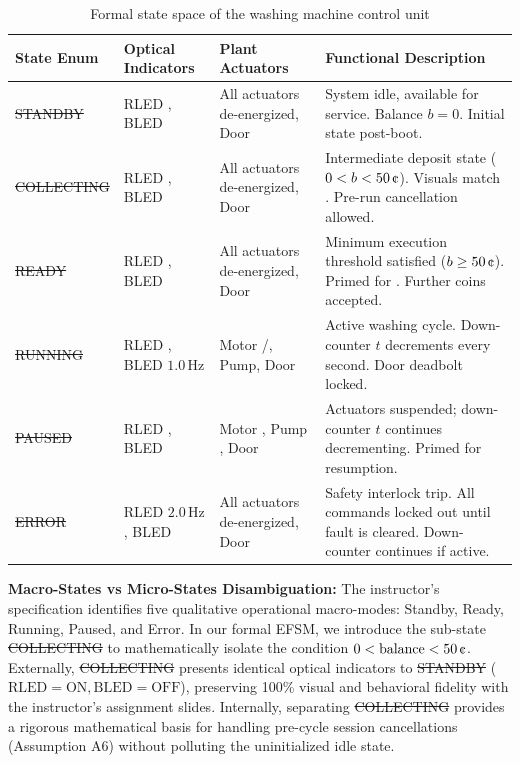 \begin{table}[H]
  \centering
  \caption{Formal state space of the washing machine control unit}
  \label{tab:states}
  \small
  \renewcommand{\arraystretch}{1.2}
  \begin{tabularx}{\linewidth}{L{2.5cm}L{3.0cm}L{3.6cm}Y}
    \toprule
    \textbf{State Enum} & \textbf{Optical Indicators} & \textbf{Plant Actuators} & \textbf{Functional Description} \\
    \midrule
    \st{STANDBY}    & RLED , BLED   & All actuators de-energized, Door  & System idle, available for service. Balance $b = 0$. Initial state post-boot. \\
    \st{COLLECTING} & RLED , BLED   & All actuators de-energized, Door  & Intermediate deposit state ($0 < b < 50\,\text{\textcent}$). Visuals match . Pre-run cancellation allowed. \\
    \st{READY}      & RLED , BLED   & All actuators de-energized, Door  & Minimum execution threshold satisfied ($b \ge 50\,\text{\textcent}$). Primed for . Further coins accepted. \\
    \st{RUNNING}    & RLED , BLED $1.0\,\text{Hz}$ & Motor /, Pump, Door  & Active washing cycle. Down-counter $t$ decrements every second. Door deadbolt locked. \\
    \st{PAUSED}     & RLED , BLED   & Motor , Pump , Door  & Actuators suspended; down-counter $t$ continues decrementing. Primed for  resumption. \\
    \st{ERROR}      & RLED $2.0\,\text{Hz}$, BLED  & All actuators de-energized, Door  & Safety interlock trip. All commands locked out until fault is cleared. Down-counter continues if active. \\
    \bottomrule
  \end{tabularx}
\end{table}

\noindent \textbf{Macro-States vs Micro-States Disambiguation:} The instructor's specification identifies
five qualitative operational macro-modes: Standby, Ready, Running, Paused, and Error. In our formal EFSM,
we introduce the sub-state \st{COLLECTING} to mathematically isolate the condition $0 < \text{balance} < 50\,\text{\textcent}$.
Externally, \st{COLLECTING} presents identical optical indicators to \st{STANDBY} ($\text{RLED}=\text{ON}, \text{BLED}=\text{OFF}$),
preserving 100\% visual and behavioral fidelity with the instructor's assignment slides. Internally, separating
\st{COLLECTING} provides a rigorous mathematical basis for handling pre-cycle session cancellations (Assumption A6)
without polluting the uninitialized idle state.
